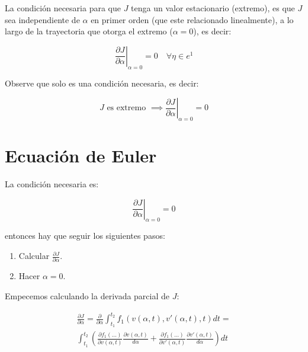     La condición necesaria para que $J$ tenga un valor estacionario (extremo), es que $J$ sea independiente de $\alpha$ en primer orden (que este relacionado linealmente), a lo largo de la trayectoria que otorga el extremo ($\alpha = 0$), es decir:

    \begin{equation}
        \left. \frac{\partial J}{\partial \alpha} \right|_{\alpha=0} = 0 \quad \forall \eta \in e^1
    \end{equation}

    \begin{nota}
        Observe que solo es una condición necesaria, es decir:

        \begin{equation*}
            J \text{ es extremo } \implies \left. \frac{\partial J}{\partial \alpha} \right|_{\alpha=0} = 0
        \end{equation*}
    \end{nota}
    \newpage
    \section{Ecuación de Euler}

    La condición necesaria es:

    \begin{equation*}
        \left. \frac{\partial J}{\partial \alpha} \right|_{\alpha=0} = 0
    \end{equation*}

    entonces hay que seguir los siguientes pasos:

    \begin{enumerate}
        \item Calcular $\frac{\partial J}{\partial \alpha}$.
        \item Hacer $\alpha = 0$.
    \end{enumerate}

    Empecemos calculando la derivada parcial de $J$:

    \begin{multline*}
        \frac{\partial J}{\partial \alpha} = \frac{\partial}{\partial \alpha} \int_{t_1}^{t_2} f_1(v(\alpha, t), v'(\alpha, t), t)dt = \\
        \int_{t_1}^{t_2}\left( \frac{\partial f_1(\dots)}{\partial v(\alpha, t)} \frac{\partial v(\alpha, t)}{d \alpha} + \frac{\partial f_1(\dots)}{\partial v'(\alpha, t)} \frac{\partial v'(\alpha, t)}{d \alpha} \right) dt
    \end{multline*}

